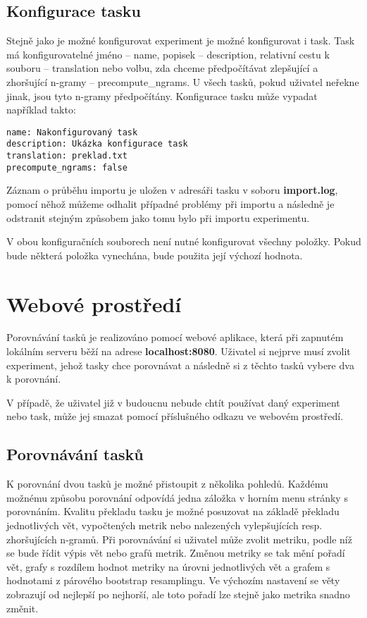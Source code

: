 \subsection{Konfigurace tasku}
Stejně jako je možné konfigurovat experiment je možné konfigurovat i task.
Task má konfigurovatelné jméno -- name, popisek -- description,
  relativní cestu k souboru -- translation nebo volbu,
  zda chceme předpočítávat zlepšující a zhoršující \mbox{n-gramy} -- precompute\_ngrams.
U všech tasků, pokud uživatel neřekne jinak, 
  jsou tyto \mbox{n-gramy} předpočítány.
Konfigurace tasku může vypadat například takto:

\begin{verbatim}
name: Nakonfigurovaný task
description: Ukázka konfigurace task
translation: preklad.txt
precompute_ngrams: false
\end{verbatim}

Záznam o průběhu importu je uložen v adresáři tasku v soboru \textbf{import.log},
  pomocí něhož můžeme odhalit případné problémy při importu
  a následně je odstranit stejným způsobem jako tomu bylo při importu experimentu.

V obou konfiguračních souborech není nutné konfigurovat všechny položky.
Pokud bude některá položka vynechána,
  bude použita její výchozí hodnota. 

\section{Webové prostředí}
Porovnávání tasků je realizováno pomocí webové aplikace,
  která při zapnutém lokálním serveru běží na adrese \textbf{localhost:8080}.
Uživatel si nejprve musí zvolit experiment,
  jehož tasky chce porovnávat a následně si z těchto tasků vybere dva k porovnání.

V případě,
  že uživatel již v budoucnu nebude chtít používat daný experiment nebo task,
  může jej smazat pomocí příslušného odkazu ve webovém prostředí.

\subsection{Porovnávání tasků}
K porovnání dvou tasků je možné přistoupit z několika pohledů.
Každému možnému způsobu porovnání odpovídá jedna záložka v horním menu stránky s porovnáním.
Kvalitu překladu tasku je možné posuzovat na základě překladu jednotlivých vět,
  vypočtených metrik nebo nalezených vylepšujících resp. zhoršujících \mbox{n-gramů}.
Při porovnávání si uživatel může zvolit metriku,
  podle níž se bude řídit výpis vět nebo grafů metrik.
Změnou metriky se tak mění pořadí vět,
  grafy s rozdílem hodnot metriky na úrovni jednotlivých vět
  a grafem s hodnotami z párového bootstrap resamplingu.
Ve výchozím nastavení se věty zobrazují od nejlepší po nejhorší,
  ale toto pořadí lze stejně jako metrika snadno změnit.

